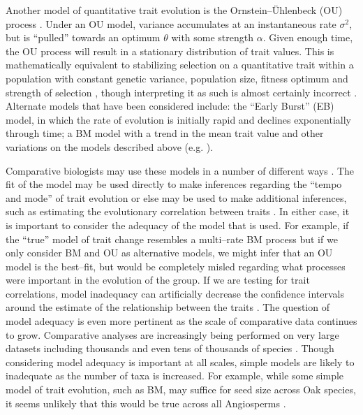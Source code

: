 \documentclass[a4paper,12pt]{article}
\begin{document}
Another model of quantitative trait evolution is the Ornstein--\"{U}hlenbeck (OU) process \citep{Felsenstein1988, Hansen1997}. Under an OU model, variance accumulates at an instantaneous rate $\sigma^2$, but is ``pulled'' towards an optimum $\theta$ with some strength $\alpha$. Given enough time, the OU process will result in a stationary distribution of trait values. This is mathematically equivalent to stabilizing selection on a quantitative trait within a population with constant genetic variance, population size, fitness optimum and strength of selection \citep{Lande1976}, though interpreting it as such is almost certainly incorrect \citep{HansenMartins1996}.  
Alternate models that have been considered include: the ``Early Burst'' (EB) \citep{Blomberg2003, Harmon2010} model, in which the rate of evolution is initially rapid and declines exponentially through time; a BM model with a trend in the mean trait value \citep{Hunt2006} and other variations on the models described above (e.g. \citep{Pagel1997, Pagel1999, ButlerKing2004, Omeara2006, Eastman2011, Beaulieu2012, SlaterMEE}). 

Comparative biologists may use these models in a number of different ways \citep{Freckleton2011, PennellHarmon}. The fit of the model may be used directly to make inferences regarding the ``tempo and mode'' of trait evolution \citep{HansenMartins1996, Mooers1999, Harmon2010} or else may be used to make additional inferences, such as estimating the evolutionary correlation between traits \citep{Felsenstein1985}. In either case, it is important to consider the adequacy of the model that is used. For example, if the ``true'' model of trait change resembles a multi--rate BM process \citep{Omeara2006, Eastman2011} but if we only consider BM and OU as alternative models, we might infer that an OU model is the best--fit, but would be completely misled regarding what processes were important in the evolution of the group. If we are testing for trait correlations, model inadequacy can artificially decrease the confidence intervals around the estimate of the relationship between the traits \citep{Rohlf2006}. The question of model adequacy is even more pertinent as the scale of comparative data continues to grow. Comparative analyses are increasingly being performed on very large datasets including thousands and even tens of thousands of species \citep{Coopermammal, Venditti2011, Jetz2012, Rabosky2013}. Though considering model adequacy is important at all scales, simple models are likely to inadequate as the number of taxa is increased. For example, while some simple  model of trait evolution, such as BM, may suffice for seed size across Oak species, it seems unlikely that this would be true across all Angiosperms \citep{Moles2005}.
\end{document}
